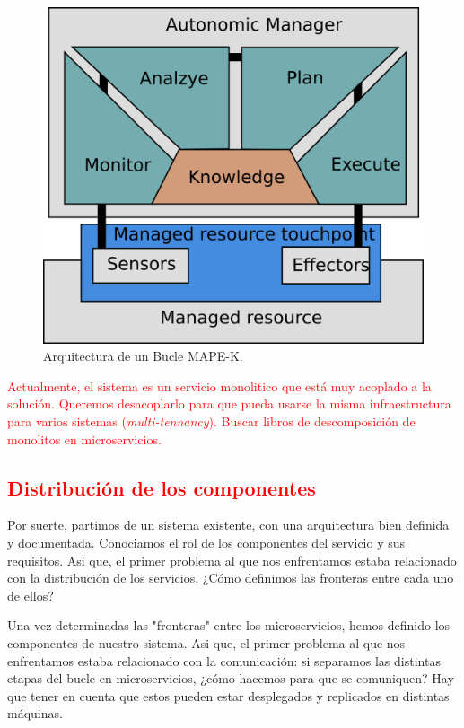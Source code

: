\begin{figure}[htb]
  \centering
  \includegraphics[scale=0.6]{01_introduccion/images/bucle-mape-k.png}
  \caption[Arquitectura de un Bucle MAPE-K.]{Arquitectura de un Bucle MAPE-K.\footnotemark}
  \label{fig:bucle-mapek2}
\end{figure}


\textcolor{red}{Actualmente, el sistema es un servicio monolitico que está muy acoplado a la solución. Queremos desacoplarlo para que pueda usarse la misma infraestructura para varios sistemas (\textit{multi-tennancy}). Buscar libros de descomposición de monolitos en microservicios.}

\subsection{\textcolor{red}{Distribución de los componentes}}

Por suerte, partimos de un sistema existente, con una arquitectura bien definida y documentada. Conociamos el rol de los componentes del servicio y sus requisitos. Asi que, el primer problema al que nos enfrentamos estaba relacionado con la distribución de los servicios. ¿Cómo definimos las fronteras entre cada uno de ellos?

Una vez determinadas las "fronteras" entre los microservicios, hemos definido los componentes de nuestro sistema. Asi que, el primer problema al que nos enfrentamos estaba relacionado con la comunicación: si separamos las distintas etapas del bucle en microservicios, ¿cómo hacemos para que se comuniquen? Hay que tener en cuenta que estos pueden estar desplegados y replicados en distintas máquinas.

